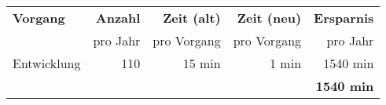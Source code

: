 \begin{tabular}{lrrrr}
    \rowcolor{heading}\textbf{Vorgang}  & \textbf{Anzahl} & \textbf{Zeit (alt)} & \textbf{Zeit (neu)} & \textbf{Ersparnis}\\
    \rowcolor{heading}\textbf{}         & pro Jahr        & pro Vorgang         & pro Vorgang         & pro Jahr\\
    \rowcolor{odd} Entwicklung          & 110             & 15 min              & 1 min               & 1540 min\\
    \hline
    \hline
    \rowcolor{heading}\textbf{} & \textbf{} & \textbf{} & \textbf{} & \textbf{1540 min} \\
    \end{tabular}